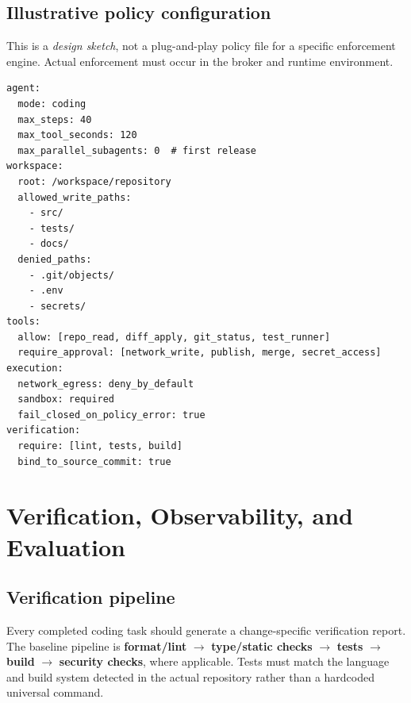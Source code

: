 \documentclass[10pt,letterpaper]{article}
\newcommand{\term}[1]{\textbf{\color{DeepBlue}#1}}
\begin{document}
\subsection{Illustrative policy configuration}
This is a \emph{design sketch}, not a plug-and-play policy file for a specific enforcement engine. Actual enforcement must occur in the broker and runtime environment.
\begin{lstlisting}[style=yamlstyle,caption={Illustrative execution policy for a repository coding agent.}]
agent:
  mode: coding
  max_steps: 40
  max_tool_seconds: 120
  max_parallel_subagents: 0  # first release
workspace:
  root: /workspace/repository
  allowed_write_paths:
    - src/
    - tests/
    - docs/
  denied_paths:
    - .git/objects/
    - .env
    - secrets/
tools:
  allow: [repo_read, diff_apply, git_status, test_runner]
  require_approval: [network_write, publish, merge, secret_access]
execution:
  network_egress: deny_by_default
  sandbox: required
  fail_closed_on_policy_error: true
verification:
  require: [lint, tests, build]
  bind_to_source_commit: true
\end{lstlisting}

\section{Verification, Observability, and Evaluation}\label{sec:evaluation}
\subsection{Verification pipeline}
Every completed coding task should generate a change-specific verification report. The baseline pipeline is \term{format/lint} $\rightarrow$ \term{type/static checks} $\rightarrow$ \term{tests} $\rightarrow$ \term{build} $\rightarrow$ \term{security checks}, where applicable. Tests must match the language and build system detected in the actual repository rather than a hardcoded universal command.
\end{document}
